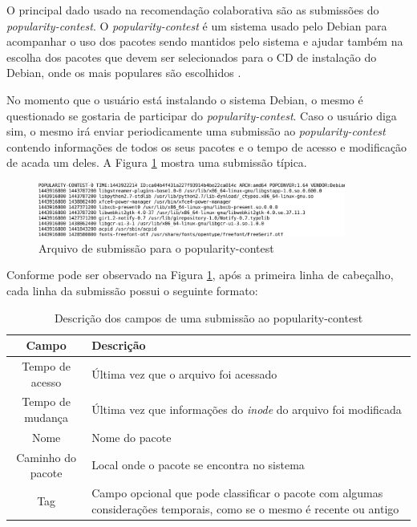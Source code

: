 O principal dado usado na recomendação colaborativa são as submissões do
\textit{popularity-contest}. O \textit{popularity-contest} é um sistema usado pelo Debian para
acompanhar o uso dos pacotes sendo mantidos pelo sistema e ajudar também na
escolha dos pacotes que devem ser selecionados para o CD de instalação do
Debian, onde os mais populares são escolhidos \cite{araujo2011apprecommender}.

No momento que o usuário está instalando o sistema Debian, o mesmo é
questionado se gostaria de participar do
\textit{popularity-contest}. Caso o usuário diga sim, o mesmo irá enviar periodicamente
uma submissão ao \textit{popularity-contest} contendo informações de todos os seus
pacotes e o tempo de acesso e modificação de acada um deles. A Figura
\ref{fig:submissao_popcon} mostra uma submissão típica.

\begin{figure}[h]
  \centering
  \includegraphics[width=0.9\textwidth]{figuras/submissao_popcon.eps}
  \caption{Arquivo de submissão para o popularity-contest}
  \label{fig:submissao_popcon}
\end{figure}

Conforme pode ser observado na Figura \ref{fig:submissao_popcon}, após a
primeira linha de cabeçalho, cada linha da submissão possui o seguinte formato:

\begin{table}[h!]
\centering
\newcommand\T{\rule{0pt}{2.8ex}}
\newcommand\B{\rule[-1.8ex]{0pt}{0pt}}
\begin{tabularx}{15cm}{| c | X |}
\hline
\rowcolor[HTML]{EFEFEF}
{\textbf{Campo}} & \textbf{Descrição} \\ \hline
{Tempo de acesso}  & Última vez que o arquivo foi acessado \\ \hline
{Tempo de mudança}   & Última vez que informações do \textit{inode} do arquivo foi
                       modificada\\ \hline
{Nome}   & Nome do pacote                  \\ \hline
{Caminho do pacote}   & Local onde o pacote se encontra no sistema \\ \hline
{Tag}   & Campo opcional que pode classificar o pacote com algumas considerações
temporais, como se o mesmo é recente ou antigo\\ \hline
\end{tabularx}
\caption{Descrição dos campos de uma submissão ao popularity-contest}
\label{tab:submissao_popcon}
\end{table}

